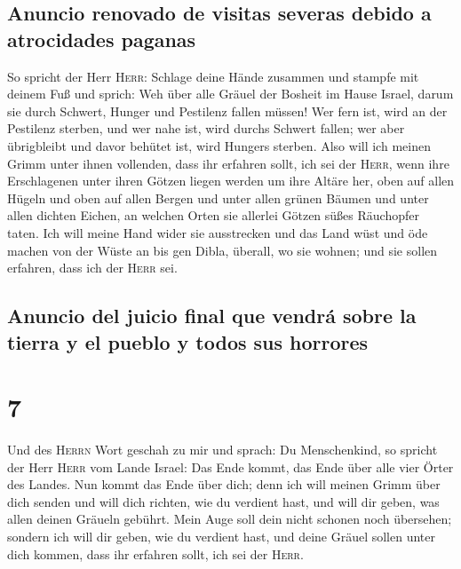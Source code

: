 \hypertarget{anuncio-renovado-de-visitas-severas-debido-a-atrocidades-paganas}{%
\subsection{Anuncio renovado de visitas severas debido a atrocidades
paganas}\label{anuncio-renovado-de-visitas-severas-debido-a-atrocidades-paganas}}

 So spricht der Herr \textsc{Herr}: Schlage deine Hände
zusammen und stampfe mit deinem Fuß und sprich: Weh über alle Gräuel der
Bosheit im Hause Israel, darum sie durch Schwert, Hunger und Pestilenz
fallen müssen!  Wer fern ist, wird an der Pestilenz
sterben, und wer nahe ist, wird durchs Schwert fallen; wer aber
übrigbleibt und davor behütet ist, wird Hungers sterben. Also will ich
meinen Grimm unter ihnen vollenden,  dass ihr erfahren
sollt, ich sei der \textsc{Herr}, wenn ihre Erschlagenen unter ihren
Götzen liegen werden um ihre Altäre her, oben auf allen Hügeln und oben
auf allen Bergen und unter allen grünen Bäumen und unter allen dichten
Eichen, an welchen Orten sie allerlei Götzen süßes Räuchopfer taten.
 Ich will meine Hand wider sie ausstrecken und das Land
wüst und öde machen von der Wüste an bis gen Dibla, überall, wo sie
wohnen; und sie sollen erfahren, dass ich der \textsc{Herr} sei.

\hypertarget{anuncio-del-juicio-final-que-vendruxe1-sobre-la-tierra-y-el-pueblo-y-todos-sus-horrores}{%
\subsection{Anuncio del juicio final que vendrá sobre la tierra y el
pueblo y todos sus
horrores}\label{anuncio-del-juicio-final-que-vendruxe1-sobre-la-tierra-y-el-pueblo-y-todos-sus-horrores}}

\hypertarget{section-6}{%
\section{7}\label{section-6}}

 Und des \textsc{Herrn} Wort geschah zu mir und sprach:
 Du Menschenkind, so spricht der Herr \textsc{Herr} vom
Lande Israel: Das Ende kommt, das Ende über alle vier Örter des Landes.
 Nun kommt das Ende über dich; denn ich will meinen Grimm
über dich senden und will dich richten, wie du verdient hast, und will
dir geben, was allen deinen Gräueln gebührt.  Mein Auge
soll dein nicht schonen noch übersehen; sondern ich will dir geben, wie
du verdient hast, und deine Gräuel sollen unter dich kommen, dass ihr
erfahren sollt, ich sei der \textsc{Herr}.

